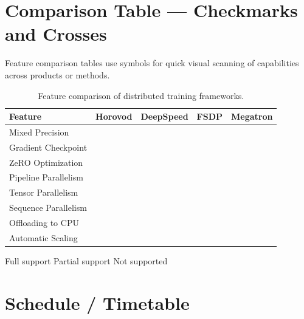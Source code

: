 \documentclass[
    language=english,
    doctype=article,
    institution=none,
]{../../omnilatex}
\newcommand{\checkmarkbold}{\textcolor{accentgreen}{\textbf{\checkmark}}}
\newcommand{\crossmark}{\textcolor{accentred}{\texttimes}}
\newcommand{\partialcheck}{\textcolor{accentorange}{\textendash}}
\begin{document}
\section{Comparison Table — Checkmarks and Crosses}
\label{sec:comparison}

Feature comparison tables use symbols for quick visual scanning of capabilities
across products or methods.

\begin{table}[htbp]
    \centering
    \caption{Feature comparison of distributed training frameworks.}
    \label{tab:comparison}
    \renewcommand{\arraystretch}{1.3}
    \begin{tabular}{l c c c c}
        \toprule
        \textbf{Feature} & \textbf{Horovod} & \textbf{DeepSpeed} & \textbf{FSDP} & \textbf{Megatron} \\
        \midrule
        Mixed Precision     & \checkmarkbold & \checkmarkbold & \checkmarkbold & \checkmarkbold \\
        Gradient Checkpoint & \crossmark      & \checkmarkbold & \checkmarkbold & \checkmarkbold \\
        ZeRO Optimization   & \crossmark      & \checkmarkbold & \partialcheck  & \crossmark      \\
        Pipeline Parallelism & \crossmark     & \partialcheck  & \crossmark     & \checkmarkbold \\
        Tensor Parallelism  & \crossmark      & \partialcheck  & \crossmark     & \checkmarkbold \\
        Sequence Parallelism & \crossmark     & \crossmark     & \crossmark     & \checkmarkbold \\
        Offloading to CPU   & \crossmark      & \checkmarkbold & \checkmarkbold & \partialcheck  \\
        Automatic Scaling   & \partialcheck  & \checkmarkbold & \checkmarkbold & \partialcheck  \\
        \bottomrule
    \end{tabular}

    \vspace{0.5em}
    \footnotesize
    \checkmarkbold\; Full support \quad
    \partialcheck\; Partial support \quad
    \crossmark\; Not supported
\end{table}

\section{Schedule / Timetable}
\label{sec:schedule}
\end{document}
